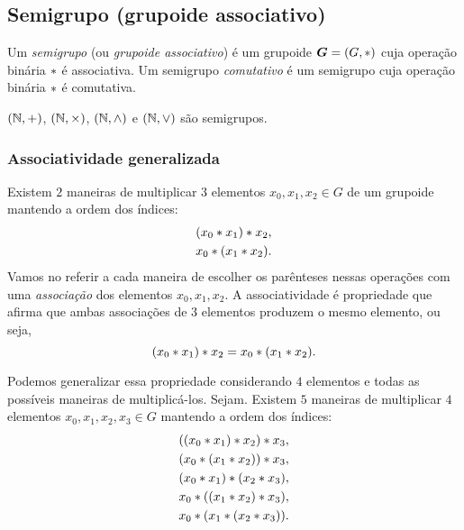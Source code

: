 \subsection{Semigrupo (grupoide associativo)}

\begin{definition}
Um \emph{semigrupo} (ou \emph{grupoide associativo}) é um grupoide $\bm G=(G,\ast)$ cuja operação binária $\ast$ é associativa. Um semigrupo \emph{comutativo} é um semigrupo cuja operação binária $\ast$ é comutativa.
\end{definition}

\begin{example}
$(\mathbb{N},+)$, $(\mathbb{N},\times)$, $(\mathbb{N},\mathbin{\wedge})$ e $(\mathbb{N},\mathbin{\vee})$ são semigrupos.
\end{example}

\subsubsection{Associatividade generalizada}

Existem $2$ maneiras de multiplicar $3$ elementos $x_0, x_1, x_2 \in G$ de um grupoide mantendo a ordem dos índices:
	\begin{align*}
	& (x_0 \ast x_1) \ast x_2, \\
	& x_0 \ast (x_1 \ast x_2).
	\end{align*}
Vamos no referir a cada maneira de escolher os parênteses nessas operações com uma \textit{associação} dos elementos $x_0, x_1, x_2$. A associatividade é propriedade que afirma que ambas associações de $3$ elementos produzem o mesmo elemento, ou seja,
	\begin{equation*}
	(x_0 \ast x_1) \ast x_2 = x_0 \ast (x_1 \ast x_2).
	\end{equation*}

Podemos generalizar essa propriedade considerando $4$ elementos e todas as possíveis maneiras de multiplicá-los. Sejam. Existem $5$ maneiras de multiplicar $4$ elementos $x_0, x_1, x_2, x_3 \in G$ mantendo a ordem dos índices:
	\begin{align*}
	& ((x_0 \ast x_1) \ast x_2) \ast x_3, \\
	& (x_0 \ast (x_1 \ast x_2)) \ast x_3, \\
	& (x_0 \ast x_1) \ast (x_2 \ast x_3), \\
	& x_0 \ast ((x_1 \ast x_2) \ast x_3), \\
	& x_0 \ast (x_1 \ast (x_2 \ast x_3)).
	\end{align*}


